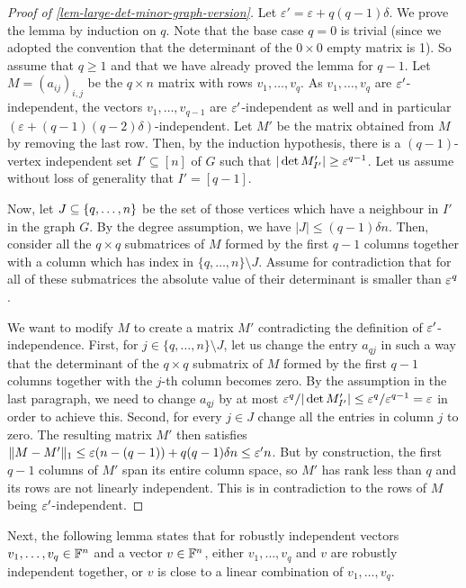 \documentclass{daj}
\theoremstyle{plain}
\theoremstyle{plain}
\theoremstyle{plain}
\theoremstyle{plain}
\theoremstyle{definition}
\theoremstyle{plain}
\theoremstyle{plain}
\theoremstyle{definition}
\theoremstyle{definition}
\theoremstyle{plain}
\begin{document}
\begin{proof}[Proof of \cref{lem-large-det-minor-graph-version}]
Let $\varepsilon'=\varepsilon+q(q-1)\delta$. We prove the lemma by induction on $q$. Note that the base case $q=0$ is trivial (since we adopted the convention that the determinant of the $0\times 0$ empty matrix is 1). So assume that $q\geq 1$ and that we have already proved the lemma for $q-1$. Let $M=(a_{ij})_{i,j}$ be the $q\times n$ matrix with rows $v_1,\dots,v_q$. As $v_1,\dots,v_q$ are $\varepsilon'$-independent, the vectors $v_1,\dots,v_{q-1}$ are $\varepsilon'$-independent as well and in particular $(\varepsilon+(q-1)(q-2)\delta)$-independent. Let $M'$ be the matrix obtained from $M$ by removing the last row. Then, by the induction hypothesis, there is a $(q-1)$-vertex independent set $I'\subseteq [n]$ of $G$ such that $|\det M_{I'}'|\ge \varepsilon^{q-1}$. Let us assume without loss of generality that $I'=[q-1]$.

Now, let $J\subseteq \lbrace q,\dots,n\rbrace$ be the set of those vertices which have a neighbour in $I'$ in the graph $G$. By the degree assumption, we have $|J|\le (q-1)\delta n$. Then, consider all the $q\times q$ submatrices of $M$ formed by the first $q-1$ columns together with a column which has index in $\{q,\dots,n\}\setminus J$. Assume for contradiction that for all of these submatrices the absolute value of their determinant is smaller than $\varepsilon^q$.

We want to modify $M$ to create a matrix $M'$ contradicting the definition of $\varepsilon'$-independence. First, for $j\in \{q,\dots,n\}\setminus J$, let us change the entry $a_{qj}$ in such a way that the determinant of the $q\times q$ submatrix of $M$ formed by the first $q-1$ columns together with the $j$-th column becomes zero. By the assumption in the last paragraph, we need to change $a_{qj}$ by at most $\varepsilon^q/|\det M_{I'}'|\leq \varepsilon^q/\varepsilon^{q-1}=\varepsilon$ in order to achieve this. Second, for every $j\in J$ change all the entries in column $j$ to zero. The resulting matrix $M'$ then satisfies $\Vert M-M'\Vert_1\le \varepsilon (n-(q-1))+q(q-1)\delta n\leq \varepsilon' n$. But by construction, the first $q-1$ columns of $M'$ span its entire column space, so $M'$ has rank less than $q$ and its rows are not linearly independent. This is in contradiction to the rows of $M$ being $\varepsilon'$-independent.
\end{proof}

Next, the following lemma states that for robustly independent vectors $v_1,\dots,v_q\in \mathbb{F}^n$ and a vector $v\in \mathbb{F}^n$, either $v_1,\dots, v_q$ and $v$ are robustly independent together, or $v$ is close to a linear combination of $v_1,\dots,v_q$.
\end{document}
